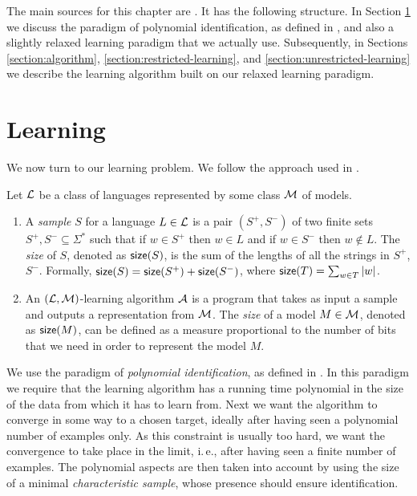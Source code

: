 The main sources for this chapter are \citep{C12, C13, C15tech}. It has the following structure. In Section \ref{section:learning} we discuss the paradigm of polynomial identification, as defined in \citep{Gold78, delaHiguera1997}, and also a slightly relaxed learning paradigm that we actually use. Subsequently, in Sections \ref{section:algorithm}, \ref{section:restricted-learning}, and \ref{section:unrestricted-learning} we describe the learning algorithm built on our relaxed learning paradigm.

\section{Learning}\label{section:learning}

We now turn to our learning problem. We follow the approach used in \citep{Eyraud2007}.

\begin{definition}\label{definition:identification1}
Let $\textup{\sf $\mathcal{L}$}$ be a class of languages represented by some class $\textup{\sf $\mathcal{M}$}$ of models.
\begin{enumerate}
\item A \emph{sample} $S$ for a language $L \in \textup{\sf $\mathcal{L}$}$ is a pair $(S^+, S^-)$ of two finite sets $S^+, S^- \subseteq \Sigma^*$ such that if $w \in S^+$ then $w \in L$ and if $w \in S^-$ then $w \notin L$. The \emph{size} of $S$, denoted as $\textup{\sf size}(S)$, is the sum of the lengths of all the strings in $S^+$, $S^-$. Formally, $\textup{\sf size}(S) = \textup{\sf size}(S^+) + \textup{\sf size}(S^-)$, where $\textup{\sf size}(T) = \sum_{w \in T} |w|$.

\item An $(\textup{\sf $\mathcal{L}$}, \textup{\sf $\mathcal{M}$})$-learning algorithm $\textup{\sf $\mathcal{A}$}$ is a program that takes as input a sample and outputs a representation from $\textup{\sf $\mathcal{M}$}$. The \emph{size} of a model $M \in \textup{\sf $\mathcal{M}$}$, denoted as $\textup{\sf size}(M)$, can be defined as a measure proportional to the number of bits that we need in order to represent the model $M$.
\end{enumerate}
\end{definition}

We use the paradigm of \emph{polynomial identification}, as defined in \citep{Gold78, delaHiguera1997}. In this paradigm we require that the learning algorithm has a running time polynomial in the size of the data from which it has to learn from. Next we want the algorithm to converge in some way to a chosen target, ideally after having seen a polynomial number of examples only. As this constraint is usually too hard, we want the convergence to take place in the limit, i.\,e., after having seen a finite number of examples. The polynomial aspects are then taken into account by using the size of a minimal \emph{characteristic sample}, whose presence should ensure identification.

